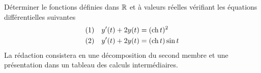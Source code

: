 Déterminer le fonctions définies dans $\mathbb{R}$ et à valeurs réelles vérifiant les équations différentielles suivantes
\begin{align*}
 &(1) & & y'(t) + 2y(t) = (\operatorname{ch} t)^2 \\
 &(2) & & y'(t) + 2y(t) = (\operatorname{ch} t)\sin t 
\end{align*}
La rédaction consistera en une décomposition du second membre et une présentation dans un tableau des calculs intermédiaires.